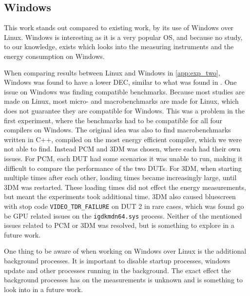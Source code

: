 \subsection{Windows}

This work stands out compared to existing work, by its use of Windows over Linux\cite{khan2018rapl, georgiou2020energy, pereira2017}. Windows is interesting as it is a very popular OS, and because no study, to our knowledge, exists which looks into the measuring instruments and the energy consumption on Windows.

When comparing results between Linux and Windows in \cref{app:exp_two}, Windows was found to have a lower DEC, similar to what was found in \cite{biksbois}. One issue on Windows was finding compatible benchmarks. Because most studies are made on Linux, most micro- and macrobenchmarks are made for Linux, which does not guarantee they are compatible for Windows. This was a problem in the first experiment, where the benchmarks had to be compatible for all four compilers on Windows. The original idea was also to find macrobenchmarks written in C++, compiled on the most energy efficient compiler, which we were not able to find. Instead PCM and 3DM was chosen, where each had their own issues. For PCM, each DUT had some scenarios it was unable to run, making it difficult to compare the performance of the two DUTs. For 3DM, when starting multiple times after each other, loading times became increasingly large, until 3DM was restarted. These loading times did not effect the energy measurements, but meant the experiments took additional time. 3DM also caused bluescreen with stop code \texttt{VIDEO\_TDR\_FAILURE} on DUT 2 in rare cases, which was found go be GPU related issues on the \texttt{igdkmdn64.sys} process. Neither of the mentioned issues related to PCM or 3DM was resolved, but is something to explore in a future work.

One thing to be aware of when working on Windows over Linux is the additional background processes. It is important to disable startup processes, windows update and other processes running in the background. The exact effect the background processes has on the measurements is unknown and is something to look into in a future work. 



